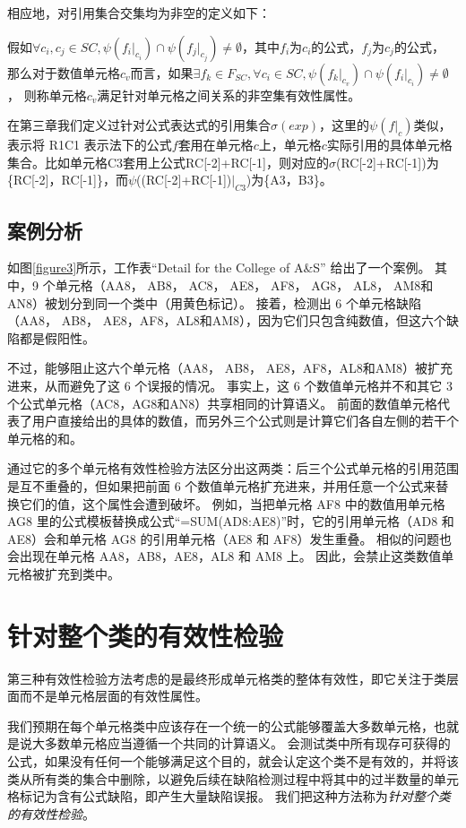 相应地，对引用集合交集均为非空的定义如下：
\begin{definition}
    假如$\forall c_i,c_j \in SC,\psi(f_i|_{c_i}) \cap \psi(f_j|_{c_j}) \neq \emptyset$，其中$f_i$为$c_i$的公式，$f_j$为$c_j$的公式，
    那么对于数值单元格$c_v$而言，如果$\exists f_k \in F_{SC}, \forall c_i \in SC, \psi(f_k|_{c_v}) \cap \psi(f_i|_{c_i}) \neq \emptyset$，
    则称单元格$c_v$满足针对单元格之间关系的非空集有效性属性。 
\end{definition}

在第三章我们定义过针对公式表达式的引用集合$\sigma(exp)$，这里的$\psi(f|_c)$类似，表示将 R1C1 表示法下的公式$f$套用在单元格$c$上，单元格$c$实际引用的具体单元格集合。比如单元格C3套用上公式RC[-2]+RC[-1]，则对应的$\sigma$(RC[-2]+RC[-1])为\{RC[-2]，RC[-1]\}，而$\psi$((RC[-2]+RC[-1])$|_{C3}$)为\{A3，B3\}。

\subsection*{案例分析}

如图\ref{figure3}所示，工作表“Detail for the College of A\&S” 给出了一个案例。
其中，9 个单元格（AA8， AB8， AC8， AE8， AF8， AG8， AL8， AM8和AN8）被\cu 划分到同一个类中（用黄色标记）。
接着，\cu 检测出 6 个单元格缺陷（AA8， AB8， AE8，AF8，AL8和AM8），因为它们只包含纯数值，但这六个缺陷都是假阳性。

不过，\wa 能够阻止这六个单元格（AA8， AB8， AE8，AF8，AL8和AM8）被扩充进来，从而避免了这 6 个误报的情况。
事实上，这 6 个数值单元格并不和其它 3 个公式单元格（AC8，AG8和AN8）共享相同的计算语义。
前面的数值单元格代表了用户直接给出的具体的数值，而另外三个公式则是计算它们各自左侧的若干个单元格的和。

\wa 通过它的多个单元格有效性检验方法区分出这两类：后三个公式单元格的引用范围是互不重叠的，但如果把前面 6 个数值单元格扩充进来，并用任意一个公式来替换它们的值，这个属性会遭到破坏。
例如，当把单元格 AF8 中的数值用单元格 AG8 里的公式模板替换成公式“=SUM(AD8:AE8)”时，它的引用单元格（AD8 和 AE8）会和单元格 AG8 的引用单元格（AE8 和 AF8）发生重叠。
相似的问题也会出现在单元格 AA8，AB8，AE8，AL8 和 AM8 上。
因此，\wa 会禁止这类数值单元格被扩充到类中。


\section{针对整个类的有效性检验}
第三种有效性检验方法考虑的是最终形成单元格类的整体有效性，即它关注于类层面而不是单元格层面的有效性属性。

我们预期在每个单元格类中应该存在一个统一的公式能够覆盖大多数单元格，也就是说大多数单元格应当遵循一个共同的计算语义。
\wa 会测试类中所有现存可获得的公式，如果没有任何一个能够满足这个目的，\wa 就会认定这个类不是有效的，并将该类从所有类的集合中删除，以避免后续在缺陷检测过程中将其中的过半数量的单元格标记为含有公式缺陷，即产生大量缺陷误报。
我们把这种方法称为\textit{针对整个类的有效性检验}。

